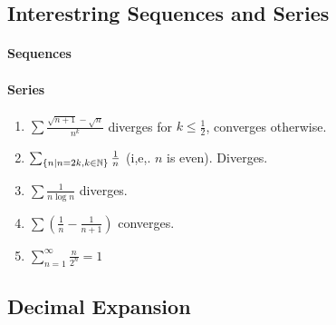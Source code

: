 \documentclass[../note.tex]{subfiles}
\begin{document}
\subsection{Interestring Sequences and Series}
\paragraph{Sequences}
\paragraph{Series}
	\small
\begin{enumerate}
	\item $\sum \frac{\sqrt{n+1}-\sqrt{n}}{n^k}$ diverges for $k\leq \frac{1}{2}$, converges otherwise.
	\item $\sum_{\{n|n=2k, k\in \mathbb{N}\}} \frac{1}{n}$ (i,e,. $n$ is even). Diverges.
	\item $\sum \frac{1}{n\log{n}}$ diverges.
	\item $\sum(\frac{1}{n}-\frac{1}{n+1})$ converges. 
	\item $\sum^{\infty}_{n=1}\frac{n}{2^n}=1$  
\end{enumerate}


\subsection{Decimal Expansion}
\end{document}
